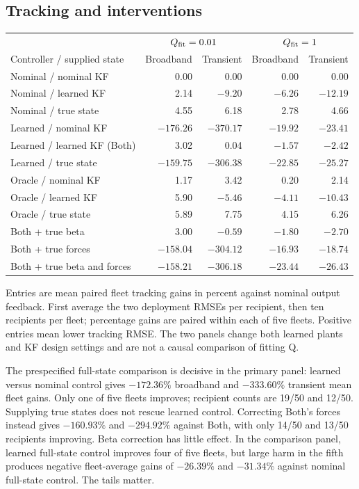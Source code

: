 \subsection{Tracking and interventions}
\begin{center}
\small
\begin{tabular}{lrrrr}
\toprule
 & \multicolumn{2}{c}{$Q_{\rm fit}=0.01$} & \multicolumn{2}{c}{$Q_{\rm fit}=1$}\\
Controller / supplied state & Broadband & Transient & Broadband & Transient\\
\midrule
Nominal / nominal KF & 0.00 & 0.00 & 0.00 & 0.00\\
Nominal / learned KF & 2.14 & $-9.20$ & $-6.26$ & $-12.19$\\
Nominal / true state & 4.55 & 6.18 & 2.78 & 4.66\\
Learned / nominal KF & $-176.26$ & $-370.17$ & $-19.92$ & $-23.41$\\
Learned / learned KF (Both) & 3.02 & 0.04 & $-1.57$ & $-2.42$\\
Learned / true state & $-159.75$ & $-306.38$ & $-22.85$ & $-25.27$\\
Oracle / nominal KF & 1.17 & 3.42 & 0.20 & 2.14\\
Oracle / learned KF & 5.90 & $-5.46$ & $-4.11$ & $-10.43$\\
Oracle / true state & 5.89 & 7.75 & 4.15 & 6.26\\
Both + true beta & 3.00 & $-0.59$ & $-1.80$ & $-2.70$\\
Both + true forces & $-158.04$ & $-304.12$ & $-16.93$ & $-18.74$\\
Both + true beta and forces & $-158.21$ & $-306.18$ & $-23.44$ & $-26.43$\\
\bottomrule
\end{tabular}
\end{center}
Entries are mean paired fleet tracking gains in percent against nominal output
feedback. First average the two deployment RMSEs per recipient, then ten
recipients per fleet; percentage gains are paired within each of five fleets.
Positive entries mean lower tracking RMSE. The two panels change both learned
plants and KF design settings and are not a causal comparison of fitting Q.

The prespecified full-state comparison is decisive in the primary panel:
learned versus nominal control gives $-172.36\%$ broadband and $-333.60\%$
transient mean fleet gains. Only one of five fleets improves; recipient counts
are 19/50 and 12/50. Supplying true states does not rescue learned control.
Correcting Both's forces instead gives $-160.93\%$ and $-294.92\%$ against Both,
with only 14/50 and 13/50 recipients improving. Beta correction has little
effect. In the comparison panel, learned full-state control improves four of
five fleets, but large harm in the fifth produces negative fleet-average gains
of $-26.39\%$ and $-31.34\%$ against nominal full-state control. The tails matter.

